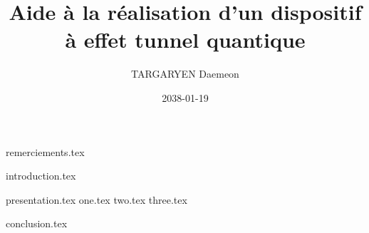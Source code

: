 \documentclass{rUTT}
\date{2038-01-19}
\author{{\sc TARGARYEN} Daemeon
}
\title{Aide à la réalisation d'un dispositif à effet tunnel quantique}
\begin{document}

    \frontpageSTB %

    {
        \myILB
    }


    \pagestyle{UTT} %
    \justifying %


    {remerciements.tex} %

    \clearpage


    {
        \setcounter{tocdepth}{1}
        \renewcommand{\contentsname}{Sommaire}
        \tableofcontents
    }

    \clearpage

    {

        \listoftables

        \listoffigures

    }


    \clearpage


    {introduction.tex}

    \clearpage

    {presentation.tex}
    {one.tex}
    {two.tex}
    {three.tex}

    \clearpage

    {conclusion.tex}
    \label{LastPage}

    \clearpage
\end{document}
